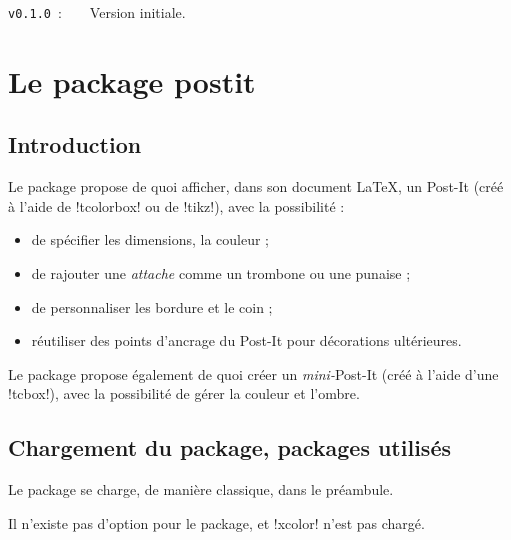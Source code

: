 \documentclass[french,a4paper,11pt]{article}
\begin{document}
\verb|v0.1.0|~:~~~~Version initiale.

\newpage

\section{Le package postit}

\subsection{Introduction}

\begin{noteblock}
Le package propose de quoi afficher, dans son document \LaTeX, un Post-It (créé à l'aide de \packagetex!tcolorbox! ou de \packagetex!tikz!), avec la possibilité :

\begin{itemize}
	\item de spécifier les dimensions, la couleur ;
	\item de rajouter une \textit{attache} comme un trombone ou une punaise ;
	\item de personnaliser les bordure et le coin ;
	\item réutiliser des points d'ancrage du Post-It pour décorations ultérieures.
\end{itemize}

Le package propose également de quoi créer un \textit{mini-}Post-It (créé à l'aide d'une \motcletex!tcbox!), avec la possibilité de gérer la couleur et l'ombre.
\end{noteblock}

\subsection{Chargement du package, packages utilisés}

\begin{importantblock}
Le package se charge, de manière classique, dans le préambule.

Il n'existe pas d'option pour le package, et \packagetex!xcolor! n'est pas chargé.
\end{importantblock}

\end{document}
